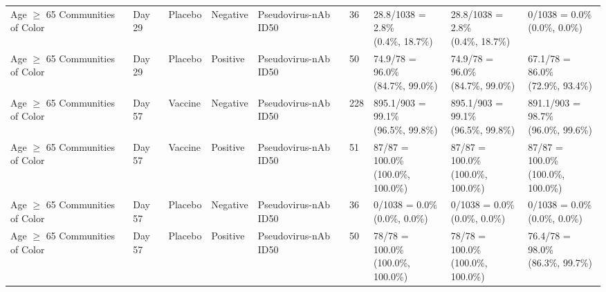 \documentclass[]{book}
\theoremstyle{definition}
\theoremstyle{definition}
\theoremstyle{definition}
\newcommand{\1}{\mathbbm{1}}
\begin{document}
\begin{landscape}
\begin{ThreePartTable}
\begin{longtable}[t]{>{\raggedright\arraybackslash}p{2.7cm}llllllll}
\hspace{1em}Age $\geq$ 65 Communities of Color & Day 29 & Placebo & Negative & Pseudovirus-nAb ID50 & 36 & \makecell[l]{28.8/1038 = 2.8\%\\(0.4\%, 18.7\%)} & \makecell[l]{28.8/1038 = 2.8\%\\(0.4\%, 18.7\%)} & \makecell[l]{0/1038 = 0.0\%\\(0.0\%, 0.0\%)}\\
\hspace{1em}Age $\geq$ 65 Communities of Color & Day 29 & Placebo & Positive & Pseudovirus-nAb ID50 & 50 & \makecell[l]{74.9/78 = 96.0\%\\(84.7\%, 99.0\%)} & \makecell[l]{74.9/78 = 96.0\%\\(84.7\%, 99.0\%)} & \makecell[l]{67.1/78 = 86.0\%\\(72.9\%, 93.4\%)}\\
\hspace{1em}Age $\geq$ 65 Communities of Color & Day 57 & Vaccine & Negative & Pseudovirus-nAb ID50 & 228 & \makecell[l]{895.1/903 = 99.1\%\\(96.5\%, 99.8\%)} & \makecell[l]{895.1/903 = 99.1\%\\(96.5\%, 99.8\%)} & \makecell[l]{891.1/903 = 98.7\%\\(96.0\%, 99.6\%)}\\
\hspace{1em}Age $\geq$ 65 Communities of Color & Day 57 & Vaccine & Positive & Pseudovirus-nAb ID50 & 51 & \makecell[l]{87/87 = 100.0\%\\(100.0\%, 100.0\%)} & \makecell[l]{87/87 = 100.0\%\\(100.0\%, 100.0\%)} & \makecell[l]{87/87 = 100.0\%\\(100.0\%, 100.0\%)}\\
\hspace{1em}Age $\geq$ 65 Communities of Color & Day 57 & Placebo & Negative & Pseudovirus-nAb ID50 & 36 & \makecell[l]{0/1038 = 0.0\%\\(0.0\%, 0.0\%)} & \makecell[l]{0/1038 = 0.0\%\\(0.0\%, 0.0\%)} & \makecell[l]{0/1038 = 0.0\%\\(0.0\%, 0.0\%)}\\
\hspace{1em}Age $\geq$ 65 Communities of Color & Day 57 & Placebo & Positive & Pseudovirus-nAb ID50 & 50 & \makecell[l]{78/78 = 100.0\%\\(100.0\%, 100.0\%)} & \makecell[l]{78/78 = 100.0\%\\(100.0\%, 100.0\%)} & \makecell[l]{76.4/78 = 98.0\%\\(86.3\%, 99.7\%)}\\

\end{longtable}
\end{ThreePartTable}
\end{landscape}
\end{document}
